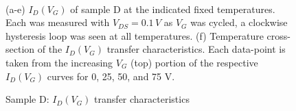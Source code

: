 \begin{figure}
\begin{centering}
~~~~
\par\end{centering}
\caption{Sample D: $I_{D}\left(V_{G}\right)$ transfer characteristics\label{fig:Sample-D-loops}}

(a-e) $I_{D}\left(V_{G}\right)$ of sample D at the indicated fixed
temperatures. Each was measured with $V_{DS}=0.1\,V$ as $V_{G}$
was cycled, a clockwise hysteresis loop was seen at all temperatures.
(f) Temperature cross-section of the $I_{D}\left(V_{G}\right)$ transfer
characteristics. Each data-point is taken from the increasing $V_{G}$
(top) portion of the respective $I_{D}\left(V_{G}\right)$ curves
for 0, 25, 50, and 75 V.
\end{figure}

